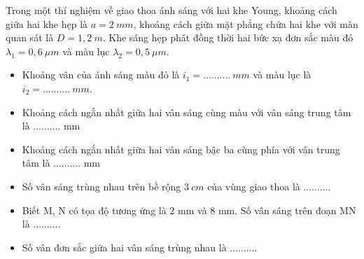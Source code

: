 \begin{vidu}%
Trong một thí nghiệm về giao thoa ánh sáng với hai khe Young, khoảng cách giữa hai khe hẹp là $a=2\ mm$, khoảng cách giữa mặt phẳng chứa hai khe với màn quan sát là $D=1,2\ m$. Khe sáng hẹp phát đồng thời hai bức xạ đơn sắc màu đỏ $\lambda_1=0,6\ \mu m$ và màu lục $\lambda_2=0,5\ \mu m$.
\begin{itemize}
\item[1.] Khoảng vân của ánh sáng màu đỏ là $i_1=..........\ mm$ và màu lục là $i_2=..........\ mm$. 
\item[2.] Khoảng cách ngắn nhất giữa hai vân sáng cùng màu với vân sáng trung tâm là .......... mm
\item[3.] Khoảng cách ngắn nhất giữa hai vân sáng bậc ba cùng phía với vân trung tâm là .......... mm
\item[4.] Số vân sáng trùng nhau trên bề rộng $3\ cm$ của vùng giao thoa là ..........
\item[5.] Biết M, N có tọa độ tương ứng là 2 mm và 8 mm. Số vân sáng trên đoạn MN là ..........
\item [6.] Số vân đơn sắc giữa hai vân sáng trùng nhau  là ..........
\end{itemize}
\end{vidu} 

